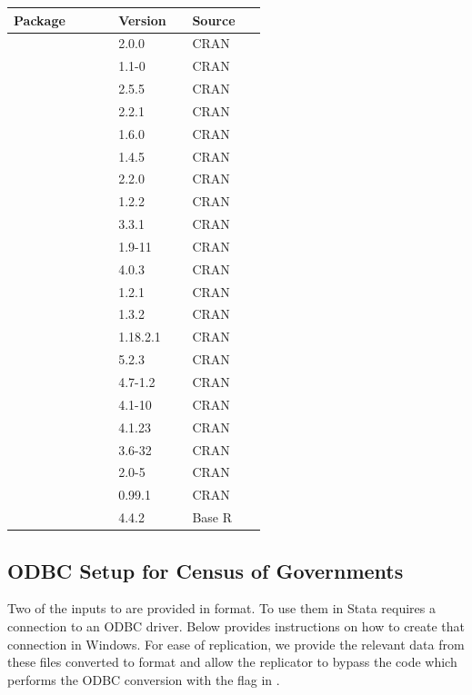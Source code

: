 \documentclass[11pt]{article}
\begin{document}
\begingroup
\small
\setlength{\tabcolsep}{6pt}
\renewcommand{\arraystretch}{1.08}
\begin{longtable}{L{0.34\linewidth}L{0.24\linewidth}L{0.24\linewidth}}
\toprule
Package & Version & Source \\
\midrule
\endhead
{} & 2.0.0 & CRAN \\
 & 1.1-0 & CRAN \\
 & 2.5.5 & CRAN \\
 & 2.2.1 & CRAN \\
 & 1.6.0 & CRAN \\
 & 1.4.5 & CRAN \\
 & 2.2.0 & CRAN \\
 & 1.2.2 & CRAN \\
 & 3.3.1 & CRAN \\
 & 1.9-11 & CRAN \\
 & 4.0.3 & CRAN \\
 & 1.2.1 & CRAN \\
 & 1.3.2 & CRAN \\
 & 1.18.2.1 & CRAN \\
 & 5.2.3 & CRAN \\
 & 4.7-1.2 & CRAN \\
 & 4.1-10 & CRAN \\
 & 4.1.23 & CRAN \\
 & 3.6-32 & CRAN \\
 & 2.0-5 & CRAN \\
 & 0.99.1 & CRAN \\
 & 4.4.2 & Base R \\
\bottomrule
\end{longtable}
\endgroup

\subsection*{ODBC Setup for Census of Governments}

Two of the inputs to  are provided in  format. To use them in Stata requires a connection to an ODBC driver. Below provides instructions on how to create that connection in Windows. For ease of replication, we provide the relevant data from these files converted to  format and allow the replicator to bypass the code which performs the ODBC conversion with the  flag in . 
\end{document}
